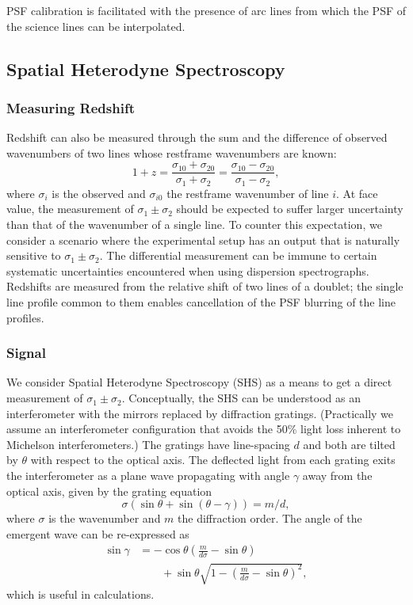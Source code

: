 \documentclass[preprint2, 10pt]{aastex}
\begin{document}
PSF calibration is facilitated with the presence of arc lines from which the
PSF  of the science lines can be interpolated.


\subsection{Spatial Heterodyne Spectroscopy}
\label{SHS:sec} 

\subsubsection{Measuring Redshift}
Redshift can also be measured through the sum and the difference of observed wavenumbers of two lines whose restframe wavenumbers are known:
\begin{equation}
1+z=\frac{\sigma_{10}+\sigma_{20}}{\sigma_{1}+\sigma_{2}}=\frac{\sigma_{10}-\sigma_{20}}{\sigma_{1}-\sigma_{2}},
\label{redshift:eqn}
\end{equation}
where $\sigma_i$ is the observed and $\sigma_{i0}$ the restframe wavenumber of line $i$.
At face value, the measurement of $\sigma_1\pm\sigma_2$ should be expected to suffer larger uncertainty than that of the wavenumber
of a single line.  To counter this expectation, we consider a scenario where the experimental setup has an output that is naturally sensitive
to $\sigma_1\pm\sigma_2$.  The differential measurement can be immune to certain systematic uncertainties encountered when using dispersion spectrographs.
Redshifts are measured from the relative shift of two lines of a doublet; 
the single line profile common to them enables cancellation of the PSF blurring of the
line profiles.


\subsubsection{Signal}

We consider Spatial Heterodyne Spectroscopy (SHS) \citep{1990SPIE.1235..622H}
as a means to get a direct measurement of  $\sigma_1\pm\sigma_2$.
Conceptually, the SHS can be understood as an interferometer with the  mirrors replaced by diffraction gratings.
(Practically we assume an interferometer configuration that  avoids the 50\% light loss inherent to  Michelson interferometers.)
The gratings have line-spacing $d$ and both are tilted
by $\theta$ with respect to the optical axis.  The deflected light from each grating exits the interferometer as a plane wave
propagating with angle $\gamma$ away from the optical axis,  given by the grating equation
\begin{equation}
\sigma\left(\sin{\theta}+\sin{\left(\theta-\gamma\right)}\right)=m/d,
\end{equation}
where $\sigma$ is the wavenumber and $m$ the diffraction order.
The angle of the emergent wave can be re-expressed as
\begin{align}
\sin{\gamma} & =-\cos{\theta} \left(\frac{m}{d\sigma} - \sin{\theta} \right) \nonumber \\
& \qquad + \sin{\theta}\sqrt{1-\left(\frac{m}{d\sigma} -\sin{\theta} \right)^2},
\end{align}
which is useful in calculations.
\end{document}
